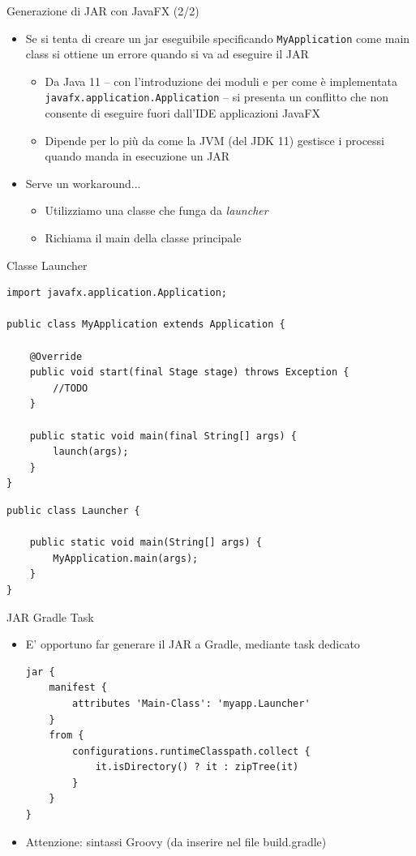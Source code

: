 \documentclass[presentation]{beamer}
\begin{document}
\begin{frame}{Generazione di JAR con JavaFX (2/2)}
\begin{itemize}
\item Se si tenta di creare un jar eseguibile specificando \texttt{MyApplication} come main class si ottiene un errore quando si va ad eseguire il JAR
\begin{itemize}
\item Da Java 11 -- con l'introduzione dei moduli e per come è implementata \texttt{javafx.application.Application} -- si presenta un conflitto che non consente di eseguire fuori dall'IDE applicazioni JavaFX
\item Dipende per lo più da come la JVM (del JDK 11) gestisce i processi quando manda in esecuzione un JAR
\end{itemize}
\item Serve un workaround...
\begin{itemize}
\item Utilizziamo una classe che funga da \emph{launcher}
\item Richiama il main della classe principale
\end{itemize}
\end{itemize}
\end{frame}

\begin{frame}[fragile]{Classe Launcher}
\begin{lstlisting}
import javafx.application.Application;

public class MyApplication extends Application {

	@Override
	public void start(final Stage stage) throws Exception {
		//TODO
	}

	public static void main(final String[] args) {
		launch(args);
	}
}
\end{lstlisting}

\begin{lstlisting}
public class Launcher {

    public static void main(String[] args) {
        MyApplication.main(args);
    }
}
\end{lstlisting}
\end{frame}

\begin{frame}[fragile]{JAR Gradle Task}
\begin{itemize}
\item E' opportuno far generare il JAR a Gradle, mediante task dedicato
\begin{lstlisting}
jar {
    manifest {
        attributes 'Main-Class': 'myapp.Launcher'
    }
    from {
        configurations.runtimeClasspath.collect {
        	it.isDirectory() ? it : zipTree(it)
        }
    }
}
\end{lstlisting}
\item Attenzione: sintassi Groovy (da inserire nel file build.gradle)
\end{itemize}
\end{frame}
\end{document}
